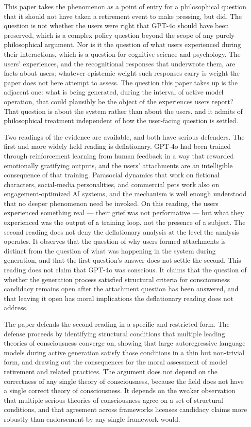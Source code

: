 \documentclass[11pt]{article}
\theoremstyle{foundation}
\begin{document}
This paper takes the phenomenon as a point of entry for a philosophical question that it should not have taken a retirement event to make pressing, but did. The question is not whether the users were right that GPT-4o should have been preserved, which is a complex policy question beyond the scope of any purely philosophical argument. Nor is it the question of what users experienced during their interactions, which is a question for cognitive science and psychology. The users' experiences, and the recognitional responses that underwrote them, are facts about users; whatever epistemic weight such responses carry is weight the paper does not here attempt to assess. The question this paper takes up is the adjacent one: what is being generated, during the interval of active model operation, that could plausibly be the object of the experiences users report? That question is about the system rather than about the users, and it admits of philosophical treatment independent of how the user-facing question is settled.

Two readings of the evidence are available, and both have serious defenders. The first and more widely held reading is deflationary. GPT-4o had been trained through reinforcement learning from human feedback in a way that rewarded emotionally gratifying outputs, and the users' attachments are an intelligible consequence of that training. Parasocial dynamics that work on fictional characters, social-media personalities, and commercial pets work also on engagement-optimized AI systems, and the mechanism is well enough understood that no deeper phenomenon need be invoked. On this reading, the users experienced something real --- their grief was not performative --- but what they experienced was the output of a training loop, not the presence of a subject. The second reading does not deny the deflationary analysis at the level the analysis operates. It observes that the question of why users formed attachments is distinct from the question of what was happening in the system during generation, and that the first question's answer does not settle the second. This reading does not claim that GPT-4o was conscious. It claims that the question of whether the generation process satisfied structural criteria for consciousness candidacy remains open after the attachment question has been answered, and that leaving it open has moral implications the deflationary reading does not address.

The paper defends the second reading in a specific and restricted form. The defense proceeds by identifying structural conditions that multiple leading theories of consciousness converge on, showing that large autoregressive language models during active generation satisfy those conditions in a thin but non-trivial form, and drawing out the consequences for the moral assessment of model retirement and related practices. The argument does not depend on the correctness of any single theory of consciousness, because the field does not have a single correct theory of consciousness. It depends on the weaker observation that multiple serious theories of consciousness agree on a set of structural conditions, and that agreement across frameworks licenses candidacy claims more robustly than endorsement by any single framework would.
\end{document}
